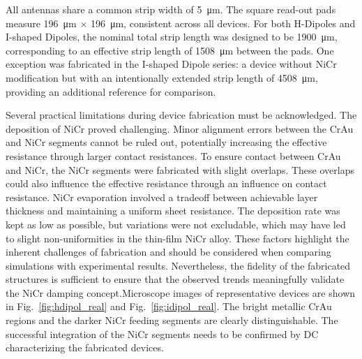 All antennas share a common strip width of \SI{5}{\micro\meter}. The square read-out pads measure
\SI{196}{\micro\meter} $\times$ \SI{196}{\micro\meter}, consistent across all devices. For both H-Dipoles and I-shaped Dipoles,
the nominal total strip length was designed to be \SI{1900}{\micro\meter}, corresponding to an effective strip length of \SI{1508}{\micro\meter} between the pads. One exception was fabricated in the I-shaped Dipole series: a device without NiCr modification but with an intentionally extended strip length of
\SI{4508}{\micro\meter}, providing an additional reference for comparison.

Several practical limitations during device fabrication must be acknowledged. The deposition of NiCr proved challenging. Minor alignment errors between the CrAu and NiCr segments cannot be ruled out, potentially increasing the effective resistance through larger contact resistances. To ensure contact between CrAu and NiCr, the NiCr segments were fabricated with slight overlaps. These overlaps could also influence the effective resistance through an influence on contact resistance. NiCr evaporation involved a tradeoff between achievable layer thickness and maintaining a uniform sheet resistance. The deposition rate was kept as low as possible, but variations were not excludable, which may have led to slight non-uniformities in the thin-film NiCr alloy. These factors highlight the inherent challenges of fabrication and should be considered when comparing simulations with experimental results. Nevertheless, the fidelity of the fabricated structures is sufficient to ensure that the observed trends meaningfully validate the NiCr damping concept.Microscope images of representative devices are shown in Fig.~\ref{fig:hdipol_real} and
Fig.~\ref{fig:idipol_real}. The bright metallic CrAu regions and the darker NiCr feeding segments are
clearly distinguishable. The successful integration of the NiCr segments needs to be confirmed by DC characterizing the fabricated devices. 


